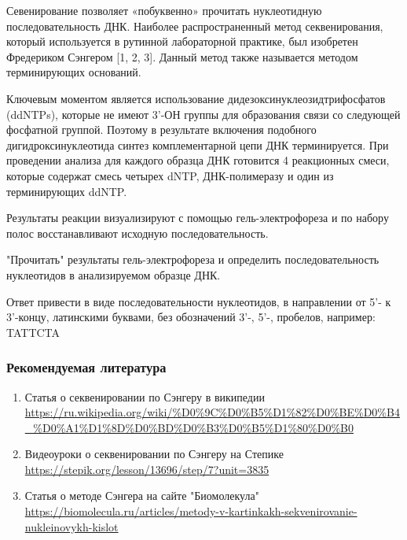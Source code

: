 
Севенирование позволяет «побуквенно» прочитать нуклеотидную  последовательность ДНК. Наиболее распространенный метод секвенирования, который используется в рутинной лабораторной практике, был изобретен Фредериком Сэнгером [1, 2, 3﻿]. Данный метод также называется методом терминирующих оснований.

Ключевым моментом является использование дидезоксинуклеозидтрифосфатов (ddNTPs), которые не имеют 3’-ОН группы для образования связи со следующей фосфатной группой. Поэтому в результате включения подобного дигидроксинуклеотида синтез комплементарной цепи ДНК терминируется. При проведении анализа для каждого образца ДНК готовится 4 реакционных смеси, которые содержат смесь четырех dNTP, ДНК-полимеразу и один из терминирующих ddNTP.

Результаты реакции визуализируют с помощью гель-электрофореза и по набору полос восстанавливают исходную последовательность. 

"Прочитать" результаты гель-электрофореза и определить последовательность нуклеотидов в анализируемом образце ДНК.


Ответ привести в виде последовательности нуклеотидов, в направлении от 5'- к 3'-концу, латинскими буквами, без обозначений 3'-, 5'-, пробелов, например: TATTCTA

\subsubsection*{Рекомендуемая литература}

\begin{enumerate}
    \item Статья о секвенировании по Сэнгеру в википедии \url{https://ru.wikipedia.org/wiki/%D0%9C%D0%B5%D1%82%D0%BE%D0%B4_%D0%A1%D1%8D%D0%BD%D0%B3%D0%B5%D1%80%D0%B0}
    \item Видеоуроки о секвенировании по Сэнгеру на Степике \url{https://stepik.org/lesson/13696/step/7?unit=3835}
    \item Статья о методе Сэнгера ﻿на сайте "Биомолекула" \url{ https://biomolecula.ru/articles/metody-v-kartinkakh-sekvenirovanie-nukleinovykh-kislot}
\end{enumerate}

\explanationSection

\answerMath{}